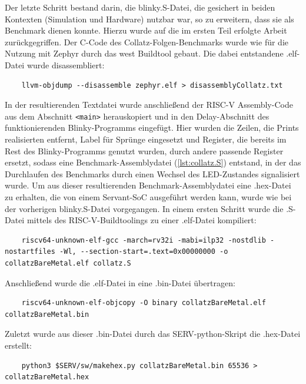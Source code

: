     Der letzte Schritt bestand darin, die blinky.S-Datei, die gesichert in beiden Kontexten (Simulation und Hardware) nutzbar war, so zu erweitern, dass sie als Benchmark dienen konnte.
    Hierzu wurde auf die im ersten Teil erfolgte Arbeit zurückgegriffen.
    Der C-Code des Collatz-Folgen-Benchmarks wurde wie für die Nutzung mit Zephyr durch das west Buildtool gebaut.
    Die dabei entstandene .elf-Datei wurde disassembliert:
    \begin{verbatim}
    llvm-objdump --disassemble zephyr.elf > disassemblyCollatz.txt
    \end{verbatim}
    In der resultierenden Textdatei wurde anschließend der RISC-V Assembly-Code aus dem Abschnitt \verb|<main>| herauskopiert und in den Delay-Abschnitt des funktionierenden Blinky-Programms eingefügt.
    Hier wurden die Zeilen, die Prints realisierten entfernt, Label für Sprünge eingesetzt und Register, die bereits im Rest des Blinky-Programms genutzt wurden, durch andere passende Register ersetzt, sodass eine Benchmark-Assemblydatei (\cref{lst:collatz.S}) entstand, in der das Durchlaufen des Benchmarks durch einen Wechsel des LED-Zustandes signalisiert wurde.
    Um aus dieser resultierenden Benchmark-Assemblydatei eine .hex-Datei zu erhalten, die von einem Servant-SoC ausgeführt werden kann, wurde wie bei der vorherigen blinky.S-Datei vorgegangen.
    In einem ersten Schritt wurde die .S-Datei mittels des RISC-V-Buildtoolings zu einer .elf-Datei kompiliert:
    \begin{verbatim}
    riscv64-unknown-elf-gcc -march=rv32i -mabi=ilp32 -nostdlib -nostartfiles -Wl, --section-start=.text=0x00000000 -o collatzBareMetal.elf collatz.S
    \end{verbatim}
    Anschließend wurde die .elf-Datei in eine .bin-Datei übertragen:
    \begin{verbatim}
    riscv64-unknown-elf-objcopy -O binary collatzBareMetal.elf collatzBareMetal.bin
    \end{verbatim}
    Zuletzt wurde aus dieser .bin-Datei durch das SERV-python-Skript die .hex-Datei erstellt:
    \begin{verbatim}
    python3 $SERV/sw/makehex.py collatzBareMetal.bin 65536 > collatzBareMetal.hex
    \end{verbatim}


